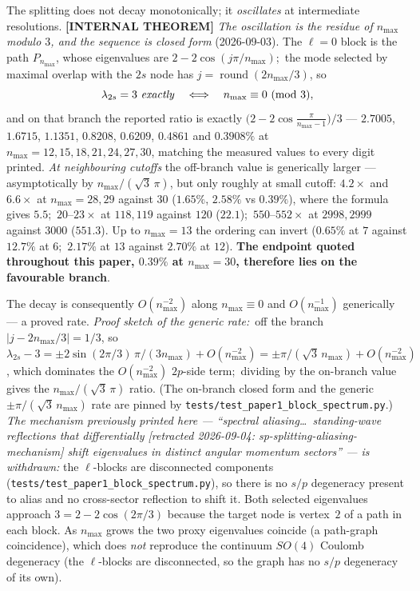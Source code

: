 \documentclass[aps,pra,twocolumn,superscriptaddress,longbibliography]{revtex4-2}
\begin{document}
The splitting does not decay monotonically; it \emph{oscillates} at
intermediate resolutions.  \textbf{[INTERNAL THEOREM]} \emph{The oscillation
is the residue of $n_{\max}$ modulo $3$, and the sequence is closed form}
(2026-09-03).  The $\ell = 0$ block is the path $P_{n_{\max}}$, whose
eigenvalues are $2 - 2\cos(j\pi/n_{\max})$;\ the mode selected by maximal
overlap with the $2s$ node has $j = \operatorname{round}(2n_{\max}/3)$, so
\begin{equation}
  \lambda_{2s} = 3 \ \text{\emph{exactly}} \quad\Longleftrightarrow\quad
  n_{\max} \equiv 0 \ (\mathrm{mod}\ 3),
  \label{eq:lambda2s_residue}
\end{equation}
and on that branch the reported ratio is exactly
$\bigl(2 - 2\cos\frac{\pi}{n_{\max}-1}\bigr)/3$ --- $2.7005$, $1.6715$,
$1.1351$, $0.8208$, $0.6209$, $0.4861$ and $0.3908\%$ at
$n_{\max} = 12, 15, 18, 21, 24, 27, 30$, matching the measured values to every
digit printed.  \emph{At neighbouring cutoffs} the off-branch value is generically larger --- asymptotically by $n_{\max}/(\sqrt{3}\,\pi)$, but only roughly at small cutoff: $4.2\times$ and $6.6\times$ at $n_{\max} = 28, 29$ against $30$ ($1.65\%$, $2.58\%$ vs $0.39\%$), where the formula gives $5.5$;\ $20$--$23\times$ at $118, 119$ against $120$ ($22.1$);\ $550$--$552\times$ at $2998, 2999$ against $3000$ ($551.3$). Up to $n_{\max} = 13$ the ordering can invert ($0.65\%$ at $7$ against $12.7\%$ at $6$;\ $2.17\%$ at $13$ against $2.70\%$ at $12$).  \textbf{The endpoint quoted throughout
this paper, $0.39\%$ at $n_{\max} = 30$, therefore lies on the favourable
branch}.

The decay is consequently $O(n_{\max}^{-2})$ along $n_{\max} \equiv 0$ and
$O(n_{\max}^{-1})$ generically --- a proved rate.  \emph{Proof sketch of the generic rate:}\
off the branch $|j - 2n_{\max}/3| = 1/3$, so
$\lambda_{2s} - 3 = \pm 2\sin(2\pi/3)\,\pi/(3n_{\max}) + O(n_{\max}^{-2})
= \pm\pi/(\sqrt{3}\,n_{\max}) + O(n_{\max}^{-2})$, which dominates the
$O(n_{\max}^{-2})$ $2p$-side term;\ dividing by the on-branch value gives
the $n_{\max}/(\sqrt{3}\,\pi)$ ratio.  (The on-branch closed form and the generic
$\pm\pi/(\sqrt{3}\,n_{\max})$ rate are pinned by
\texttt{tests/test\_paper1\_block\_spectrum.py}.)  \emph{The mechanism previously printed here
--- ``spectral aliasing\ldots\ standing-wave reflections that differentially [retracted 2026-09-04: sp-splitting-aliasing-mechanism]
shift eigenvalues in distinct angular momentum sectors'' --- is withdrawn:}
the $\ell$-blocks are disconnected components
(\texttt{tests/test\_paper1\_block\_spectrum.py}), so there is no $s/p$
degeneracy present to alias and no cross-sector reflection to shift it.  Both
selected eigenvalues approach $3 = 2 - 2\cos(2\pi/3)$ because the target node
is vertex~$2$ of a path in each block.  As $n_{\max}$ grows the two proxy
eigenvalues coincide (a path-graph coincidence), which does \emph{not}
reproduce the continuum $SO(4)$ Coulomb degeneracy (the $\ell$-blocks are
disconnected, so the graph has no $s/p$ degeneracy of its own).
\end{document}
